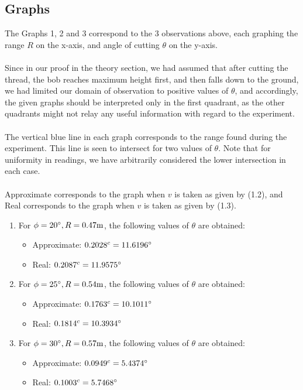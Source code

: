 \subsection{Graphs}
The Graphs 1, 2 and 3 correspond to the 3 observations above, each graphing the range $R$ on the x-axis, and angle of cutting $\theta$ on the y-axis.
\\ \\
Since in our proof in the theory section, we had assumed that after cutting the thread, the bob reaches maximum height first, and then falls down to the ground, we had limited our domain of observation to positive values of $\theta$, and accordingly, the given graphs should be interpreted only in the first quadrant, as the other quadrants might not relay any useful information with regard to the experiment.
\\ \\
The vertical blue line in each graph corresponds to the range found during the experiment. This line is seen to intersect for two values of $\theta$. Note that for uniformity in readings, we have arbitrarily considered the lower intersection in each case.
\\ \\
Approximate corresponds to the graph when $v$ is taken as given by (1.2), and Real corresponds to the graph when $v$ is taken as given by (1.3).
  \begin{enumerate}
  \item For $\phi=20\degree, R=0.47 \mathrm{m}$, the following values of $\theta$ are obtained:
    \begin{itemize}
    \item Approximate: $0.2028^c = 11.6196\degree$
    \item Real: $0.2087^c = 11.9575\degree$
    \end{itemize}
  \item For $\phi=25\degree, R=0.54 \mathrm{m}$, the following values of $\theta$ are obtained:
    \begin{itemize}
    \item Approximate: $0.1763^c = 10.1011\degree$
    \item Real: $0.1814^c = 10.3934\degree$
    \end{itemize}
  \item For $\phi=30\degree, R=0.57 \mathrm{m}$, the following values of $\theta$ are obtained:
    \begin{itemize}
    \item Approximate: $0.0949^c = 5.4374\degree$
    \item Real: $0.1003^c = 5.7468\degree$
      \end{itemize}
  \end{enumerate}

